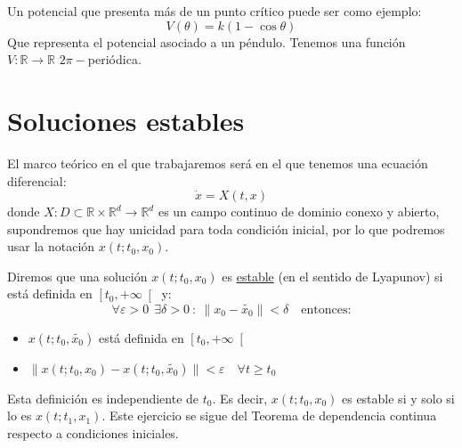 \begin{ejemplo}
    Un potencial que presenta más de un punto crítico puede ser como ejemplo:
    \begin{equation*}
        V(\theta) = k(1-\cos\theta)
    \end{equation*}
    Que representa el potencial asociado a un péndulo. Tenemos una función $V:\mathbb{R}\to\mathbb{R}$ $2\pi-$periódica.
\end{ejemplo}

\section{Soluciones estables}
\noindent
El marco teórico en el que trabajaremos será en el que tenemos una ecuación diferencial:
\begin{equation*}
    \dot{x} = X(t,x)
\end{equation*}
donde $X:D\subset\mathbb{R}\times\mathbb{R}^d\to\mathbb{R}^d$ es un campo continuo de dominio conexo y abierto, supondremos que hay unicidad para toda condición inicial, por lo que podremos usar la notación $x(t;t_0,x_0)$.

\begin{definicion}
    Diremos que una solución $x(t;t_0,x_0)$ es \underline{estable} (en el sentido de Lyapunov) si está definida en $\left[t_0,+\infty\right[$ y:
        \begin{equation*}
            \forall \varepsilon>0~~\exists \delta>0~:~\|x_0-\widetilde{x_0}\| < \delta \quad \text{entonces:}
        \end{equation*}
        \begin{itemize}
            \item $x(t;t_0,\widetilde{x_0})$ está definida en $\left[t_0,+\infty\right[$
            \item $\|x(t;t_0,x_0)-x(t;t_0,\widetilde{x_0})\| < \varepsilon\quad \forall t\geq t_0$
        \end{itemize}
\end{definicion}

\begin{ejercicio}
    Esta definición es independiente de $t_0$. Es decir, $x(t;t_0,x_0)$ es estable si y solo si lo es $x(t;t_1,x_1)$. Este ejercicio se sigue del Teorema de dependencia continua respecto a condiciones iniciales.
\end{ejercicio}

